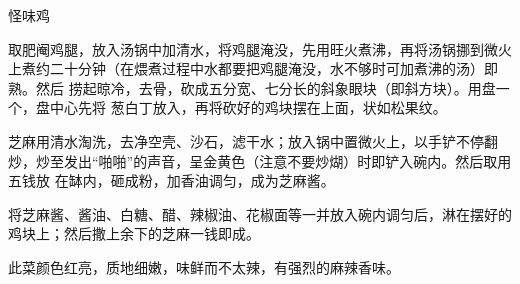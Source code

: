 %
%
%
%
%
%
%
\begin{recipe}{怪味鸡}

\ingredients


\preparation

\step 取肥阉鸡腿，放入汤锅中加清水，将鸡腿淹没，先用旺火煮沸，再将汤锅挪到微火
上煮约二十分钟（在煨煮过程中水都要把鸡腿淹没，水不够时可加煮沸的汤）即熟。然后
捞起晾冷，去骨，砍成五分宽、七分长的斜象眼块（即斜方块）。用盘一个，盘中心先将
葱白丁放入，再将砍好的鸡块摆在上面，状如松果纹。

\step 芝麻用清水淘洗，去净空壳、沙石，滤干水；放入锅中置微火上，以手铲不停翻
炒，炒至发出“啪啪”的声音，呈金黄色（注意不要炒煳）时即铲入碗内。然后取用五钱放
在缽内，砸成粉，加香油调匀，成为芝麻酱。

\step 将芝麻酱、酱油、白糖、醋、辣椒油、花椒面等一并放入碗内调匀后，淋在摆好的
鸡块上；然后撒上余下的芝麻一钱即成。

\features

此菜颜色红亮，质地细嫩，味鲜而不太辣，有强烈的麻辣香味。

\end{recipe}


